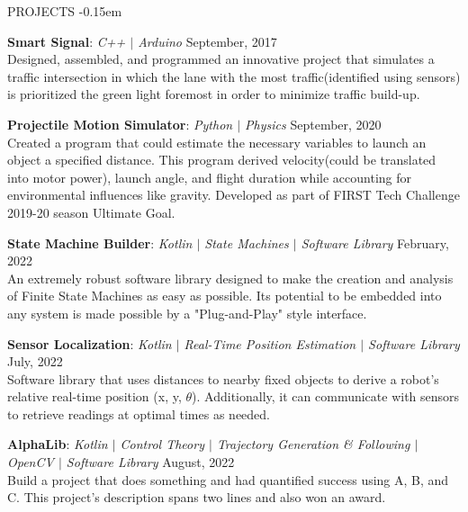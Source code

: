 \documentclass{resume} %
\begin{document}
    \vspace{-0.8em}
    \begin{rSection}{PROJECTS}
        \vspace{-1.0em}
        \itemsep -0.15em {} 
        \item \textbf{Smart Signal}: \textit{C++ $\vert$ Arduino} \hfill {September, 2017}\vspace{0.25em} \\
        {Designed, assembled, and programmed an innovative project that simulates a traffic intersection in which the lane with the most traffic(identified using sensors) is prioritized the green light foremost in order to minimize traffic build-up.}

        \item \textbf{Projectile Motion Simulator}: \textit{Python $\vert$ Physics} \hfill {September, 2020}\vspace{0.25em} \\
        {Created a program that could estimate the necessary variables to launch an object a specified distance. This program derived velocity(could be translated into motor power), launch angle, and flight duration while accounting for environmental influences like gravity. Developed as part of FIRST Tech Challenge 2019-20 season Ultimate Goal.}

        \item \textbf{State Machine Builder}: \textit{Kotlin $\vert$ State Machines $\vert$ Software Library} \hfill {February, 2022}\vspace{0.25em} \\
        {An extremely robust software library designed to make the creation and analysis of Finite State Machines as easy as possible. Its potential to be embedded into any system is made possible by a "Plug-and-Play" style interface.}

        \item \textbf{Sensor Localization}: \textit{Kotlin $\vert$ Real-Time Position Estimation $\vert$ Software Library} \hfill {July, 2022} \vspace{0.25em}\\
        {Software library that uses distances to nearby fixed objects to derive a robot's relative real-time position (x, y, $\theta$). Additionally, it can communicate with sensors to retrieve readings at optimal times as needed.}

        \item \textbf{AlphaLib}: \textit{Kotlin $\vert$ Control Theory $\vert$ Trajectory Generation \& Following $\vert$ OpenCV $\vert$ Software Library} \hfill {August, 2022} \vspace{0.25em}\\
        {Build a project that does something and had quantified success using A, B, and C. This project's description spans two lines and also won an award.}
    \end{rSection} 
\end{document}
